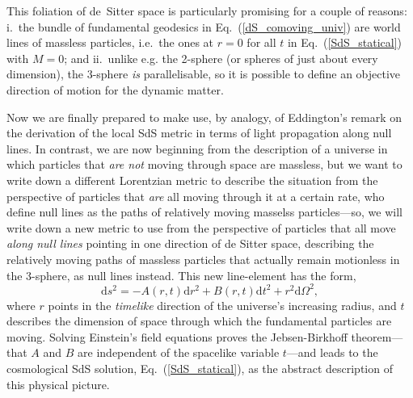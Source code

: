 \documentclass[11pt]{article}
\begin{document}
\begin{appendix}
This foliation of de~Sitter space is particularly promising for a couple of reasons: i.\ the bundle of fundamental geodesics in Eq.~(\ref{dS_comoving_univ}) are world lines of massless particles, i.e.\ the ones at $r=0$ for all $t$ in Eq.~(\ref{SdS_statical}) with $M=0$; and ii.\ unlike e.g. the 2-sphere (or spheres of just about every dimension), the 3-sphere \textit{is} parallelisable, so it is possible to define an objective direction of motion for the dynamic matter.


Now we are finally prepared to make use, by analogy, of Eddington's remark on the derivation of the local SdS metric in terms of light propagation along null lines. In contrast, we are now beginning from the description of a universe in which particles that \textit{are not} moving through space are massless, but we want to write down a different Lorentzian metric to describe the situation from the perspective of particles that \textit{are} all moving through it at a certain rate, who define null lines as the paths of relatively moving masselss particles---so, we will write down a new metric to use from the perspective of particles that all move \textit{along null lines} pointing in one direction of de Sitter space, describing the relatively moving paths of massless particles that actually remain motionless in the 3-sphere, as null lines instead. This new line-element has the form,
\begin{equation}
\mathrm{d}s^2=-A(r,t)\mathrm{d}r^2+B(r,t)\mathrm{d}t^2+r^2\mathrm{d}\Omega^2,
\end{equation}
where $r$ points in the \textit{timelike} direction of the universe's increasing radius, and $t$ describes the dimension of space through which the fundamental particles are moving. Solving Einstein's field equations proves the Jebsen-Birkhoff theorem---that $A$ and $B$ are independent of the spacelike variable $t$---and leads to the cosmological SdS solution, Eq.~(\ref{SdS_statical}), as the abstract description of this physical picture.


\end{appendix}
\end{document}
